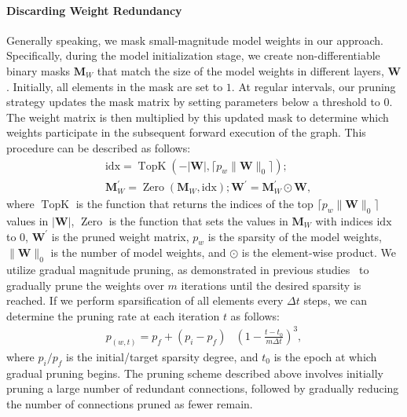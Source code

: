 \documentclass[letterpaper]{article} %
\begin{document}
\paragraph{Discarding Weight Redundancy} 
Generally speaking, we mask small-magnitude model weights in our approach. Specifically, during the model initialization stage, we create non-differentiable binary masks $\mathbf{M}_{W}$ that match the size of the model weights in different layers, $\boldsymbol{W}$. Initially, all elements in the mask are set to $1$. At regular intervals, our pruning strategy updates the mask matrix by setting parameters below a threshold to $0$. The weight matrix is then multiplied by this updated mask to determine which weights participate in the subsequent forward execution of the graph. This procedure can be described as follows:
\begin{equation}
\begin{aligned}
&\mathrm{idx}=\operatorname{TopK}(-|\mathbf{W}|,\lceil p_{w} \|\mathbf{W} \|_{0} \rceil); \\& \mathbf{M}_{W}^{\prime} = \operatorname{Zero}(\mathbf{M}_{W}, \mathrm{idx}); \mathbf{W}^{\prime} = \mathbf{M}_{W}^{\prime} \odot \mathbf{W}, 
\label{eq:prune-w}
\end{aligned}
\end{equation}
where $\operatorname{TopK}$ is the function that returns the indices of the top $\lceil p_{w} \|\mathbf{W} \|_{0}\rceil$ values in $|\mathbf{W}|$, $\operatorname{Zero}$ is the function that sets the values in $\mathbf{M}_{W}$ with indices $\mathrm{idx}$ to $0$,  $\mathbf{W}^{\prime}$ is the pruned weight matrix,  $p_{w}$ is the sparsity of the model weights, $\|\mathbf{W} \|_{0}$ is the number of model weights, and $\odot$ is the element-wise product. We utilize gradual magnitude pruning, as demonstrated in previous studies~\cite{gradual-prune,granet} to gradually prune the weights over $m$ iterations until the desired sparsity is reached. If we perform sparsification of all elements every $\Delta t$ steps, we can determine the pruning rate at each iteration $t$ as follows:
\begin{equation}
\begin{aligned} 
p_{(w,t)}=p_{f}+\left(p_{i}-p_{f}\right)&\left(1-\frac{t-t_{0}}{m \Delta t}\right)^{3}, 
\label{eq:gradual-pruning}
\end{aligned}
\end{equation}
where $p_{i}/p_{f}$ is the initial/target sparsity degree, and $t_{0}$ is the epoch at which gradual pruning begins. The pruning scheme described above involves initially pruning a large number of redundant connections, followed by gradually reducing the number of connections pruned as fewer remain.
\end{document}
